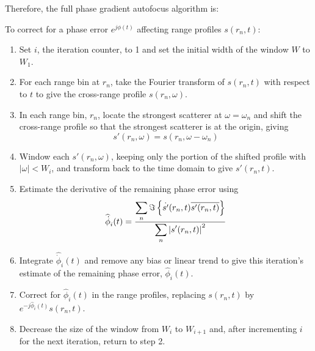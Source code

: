 Therefore, the full phase gradient autofocus algorithm is:

\begin{algorithm}
\label{mc alg:PGA}\mbox{}\par

To correct for a phase error $e^{j\phi(t)}$ affecting range profiles
$s(r_n,t)$:
\begin{enumerate}
\item Set $i$, the iteration counter, to 1 and set the initial width of
the window $W$ to $W_1$.

\item For each range bin at $r_n$, take the Fourier transform of $s(r_n,t)$
with respect to $t$ to give the cross-range profile $s(r_n,\omega)$.

\item In each range bin, $r_n$, locate the strongest scatterer at
$\omega=\omega_n$ and shift the cross-range profile so that the strongest
scatterer is at the origin, giving
\begin{equation}
s'(r_n,\omega)=s(r_n,\omega-\omega_n)
\end{equation}

\item Window each $s'(r_n,\omega)$, keeping only the portion of the shifted
profile with $\left|\omega\right|<W_i$, and transform back to the time
domain to give $s'(r_n,t)$.

\item Estimate the derivative of the remaining phase error using
\begin{equation}
\widehat{\dot{\phi}}_i(t)=
\frac{\displaystyle\sum_n\Im\left\{\dot{s'}(r_n,t)\overline{s'(r_n,t)}\right\}}
{\displaystyle\sum_n\left|s'(r_n,t)\right|^2}
\end{equation}

\item Integrate $\widehat{\dot{\phi}}_i(t)$ and remove any bias or linear
trend to give this iteration's estimate of the remaining phase error,
$\widehat{\phi}_i(t)$.

\item Correct for $\widehat{\phi}_i(t)$ in the range profiles, replacing
$s(r_n,t)$ by $e^{-j\widehat{\phi}_i(t)}s(r_n,t)$.

\item Decrease the size of the window from $W_i$ to $W_{i+1}$ and, after
incrementing $i$ for the next iteration, return to step 2.
\end{enumerate}
\end{algorithm}


